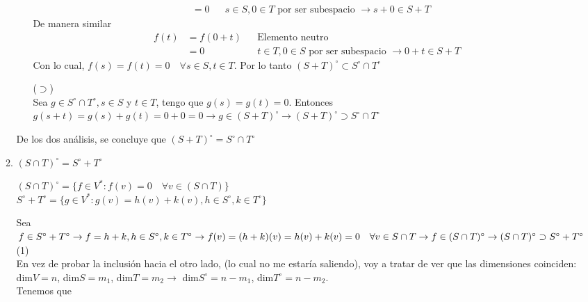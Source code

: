 \begin{enumerate}
\begin{enumerate}
\begin{mdframed}[style=s]
\begin{itemize}
\begin{align*}
                                    &=0&&\text{$s\in S, 0\in T$ por ser subespacio $\to s+0\in S+T$}
                                \end{align*}
                                De manera similar
                                \begin{align*}
                                    f(t)&=f(0+t)&&\text{Elemento neutro}\\
                                    &=0&&\text{$t\in T, 0\in S$ por ser subespacio $\to 0+t\in S+T$}
                                \end{align*}
                                Con lo cual, $f(s)=f(t)=0\quad\forall s\in S,t\in T$. Por lo tanto $(S+T)^\circ\subset S^\circ\cap T^\circ$
                            \item[($\supset$)]\hfill\\
                                Sea $g\in S^\circ\cap T^\circ, s\in S$ y $t\in T$, tengo que $g(s)=g(t)=0$. Entonces $g(s+t)=g(s)+g(t)=0+0=0\to g\in(S+T)^\circ\to (S+T)^\circ\supset S^\circ\cap T^\circ$
                        \end{itemize}
                        De los dos análisis, se concluye que $(S+T)^\circ = S^\circ\cap T^\circ$
                    \end{mdframed}
                \item $(S\cap T)^\circ=S^\circ + T^\circ$
                    \begin{mdframed}[style=s]
                        \begin{tightcenter}
                            $(S\cap T)^\circ=\{f\in V^*:f(v)=0\quad\forall v\in(S\cap T)\}$\\
                            $S^\circ +T^\circ=\{g\in V^*:g(v)=h(v)+k(v),h\in S^\circ,k\in T^\circ\}$
                        \end{tightcenter}
                        Sea $f\in S^\circ +T^\circ\to f=h+k,h\in S^\circ,k\in T^\circ\to f(v)=(h+k)(v)=h(v)+k(v)=0\quad\forall v\in S\cap T\to\\f\in (S\cap T)^\circ\to (S\cap T)^\circ\supset S^\circ +T^\circ$(1)\\
                        En vez de probar la inclusión hacia el otro lado, (lo cual no me estaría saliendo), voy a tratar de ver que las dimensiones coinciden:\\
                        dim$V=n$, dim$S=m_1$, dim$T=m_2\to$ dim$S^\circ=n-m_1$, dim$T^\circ=n-m_2$.\\
                        Tenemos que 

\end{mdframed}
\end{enumerate}
\end{enumerate}
